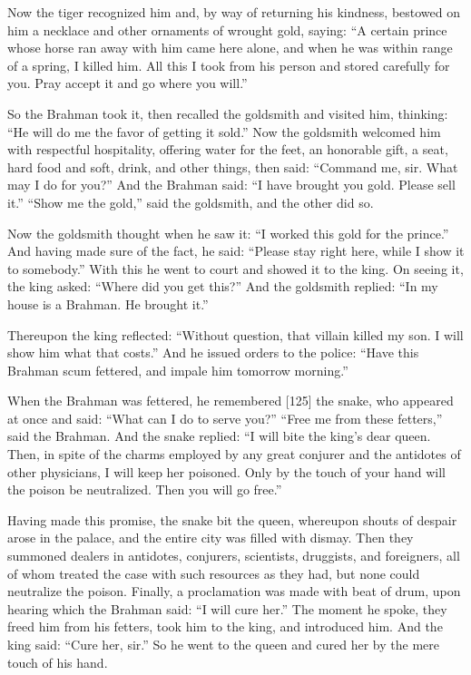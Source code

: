 \documentclass[article, twoside, 14pt]{memoir}
\begin{document}
Now the tiger recognized him and, by way of returning his kindness,
bestowed on him a necklace and other ornaments of wrought gold,
saying:
``A certain prince whose horse ran away with him came here alone, and when he was within range of a spring, I killed him. All this I took from his person and stored carefully for you. Pray accept it and go where you will.''

So the Brahman took it, then recalled the goldsmith and visited
him, thinking: ``He will do me the favor of getting it sold.'' Now
the goldsmith welcomed him with respectful hospitality, offering
water for the feet, an honorable gift, a seat, hard food and soft,
drink, and other things, then said:
``Command me, sir. What may I do for you?'' And the Brahman said:
``I have brought you gold. Please sell it.'' ``Show me the gold,''
said the goldsmith, and the other did so.

Now the goldsmith thought when he saw it:
``I worked this gold for the prince.'' And having made sure of the
fact, he said:
``Please stay right here, while I show it to somebody.'' With this
he went to court and showed it to the king. On seeing it, the king
asked: ``Where did you get this?'' And the goldsmith replied:
``In my house is a Brahman. He brought it.''

Thereupon the king reflected:
``Without question, that villain killed my son. I will show him what that costs.''
And he issued orders to the police:
``Have this Brahman scum fettered, and impale him tomorrow morning.''

When the Brahman was fettered, he remembered [125] the snake, who
appeared at once and said: ``What can I do to serve you?''
``Free me from these fetters,'' said the Brahman. And the snake
replied:
``I will bite the king's dear queen. Then, in spite of the charms employed by any great conjurer and the antidotes of other physicians, I will keep her poisoned. Only by the touch of your hand will the poison be neutralized. Then you will go free.''

Having made this promise, the snake bit the queen, whereupon shouts
of despair arose in the palace, and the entire city was filled with
dismay. Then they summoned dealers in antidotes, conjurers,
scientists, druggists, and foreigners, all of whom treated the case
with such resources as they had, but none could neutralize the
poison. Finally, a proclamation was made with beat of drum, upon
hearing which the Brahman said: ``I will cure her.'' The moment he
spoke, they freed him from his fetters, took him to the king, and
introduced him. And the king said: ``Cure her, sir.'' So he went to
the queen and cured her by the mere touch of his hand.
\end{document}
